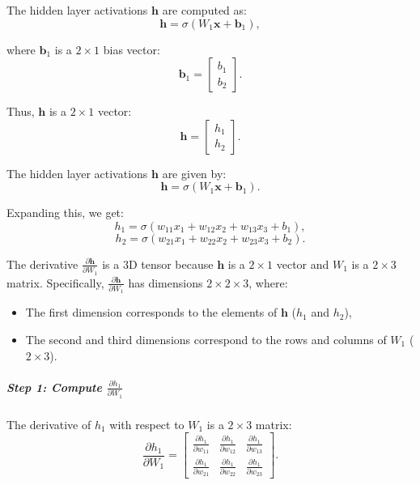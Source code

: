 \begin{notechapter}
The hidden layer activations \( \mathbf{h} \) are computed as:
\[
\mathbf{h} = \sigma(W_1 \mathbf{x} + \mathbf{b}_1),
\]

where \( \mathbf{b}_1 \) is a \( 2 \times 1 \) bias vector:
\[
\mathbf{b}_1 = \begin{bmatrix}
b_1 \\
b_2
\end{bmatrix}.
\]

Thus, \( \mathbf{h} \) is a \( 2 \times 1 \) vector:
\[
\mathbf{h} = \begin{bmatrix}
h_1 \\
h_2
\end{bmatrix}.
\]

The hidden layer activations \( \mathbf{h} \) are given by:
\[
\mathbf{h} = \sigma(W_1 \mathbf{x} + \mathbf{b}_1).
\]

Expanding this, we get:
\[
h_1 = \sigma(w_{11} x_1 + w_{12} x_2 + w_{13} x_3 + b_1),
\]
\[
h_2 = \sigma(w_{21} x_1 + w_{22} x_2 + w_{23} x_3 + b_2).
\]

The derivative \( \frac{\partial \mathbf{h}}{\partial W_1} \) is a 3D tensor because \( \mathbf{h} \) is a \( 2 \times 1 \) vector and \( W_1 \) is a \( 2 \times 3 \) matrix. Specifically, \( \frac{\partial \mathbf{h}}{\partial W_1} \) has dimensions \( 2 \times 2 \times 3 \), where:
\begin{itemize}
    \item The first dimension corresponds to the elements of \( \mathbf{h} \) (\( h_1 \) and \( h_2 \)),
    \item The second and third dimensions correspond to the rows and columns of \( W_1 \) (\( 2 \times 3 \)).
\end{itemize}

\subparagraph*{Step 1: Compute \( \frac{\partial h_1}{\partial W_1} \)}

The derivative of \( h_1 \) with respect to \( W_1 \) is a \( 2 \times 3 \) matrix:
\[
\frac{\partial h_1}{\partial W_1} = \begin{bmatrix}
\frac{\partial h_1}{\partial w_{11}} & \frac{\partial h_1}{\partial w_{12}} & \frac{\partial h_1}{\partial w_{13}} \\
\frac{\partial h_1}{\partial w_{21}} & \frac{\partial h_1}{\partial w_{22}} & \frac{\partial h_1}{\partial w_{23}}
\end{bmatrix}.
\]


\end{notechapter}

